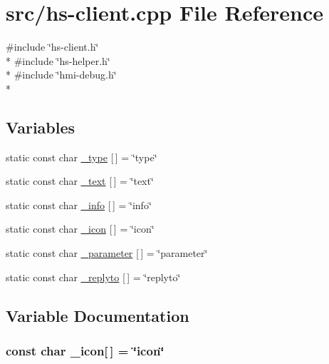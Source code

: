 \hypertarget{hs-client_8cpp}{}\section{src/hs-\/client.cpp File Reference}
\label{hs-client_8cpp}
{\ttfamily \#include \char`\"{}hs-\/client.\+h\char`\"{}}\\*
{\ttfamily \#include \char`\"{}hs-\/helper.\+h\char`\"{}}\\*
{\ttfamily \#include \char`\"{}hmi-\/debug.\+h\char`\"{}}\\*
\subsection*{Variables}
\begin{DoxyCompactItemize}
\item 
static const char \hyperlink{hs-client_8cpp_a1c24b43242df87f75631175c75afdcda}{\+\_\+type} \mbox{[}$\,$\mbox{]} = \char`\"{}type\char`\"{}
\item 
static const char \hyperlink{hs-client_8cpp_ad177811d47939fe9404de88672a980ab}{\+\_\+text} \mbox{[}$\,$\mbox{]} = \char`\"{}text\char`\"{}
\item 
static const char \hyperlink{hs-client_8cpp_ae125cd80cb98582684636e46ecf33cac}{\+\_\+info} \mbox{[}$\,$\mbox{]} = \char`\"{}info\char`\"{}
\item 
static const char \hyperlink{hs-client_8cpp_a5476c8a51997c773220bec9fc02eeaf5}{\+\_\+icon} \mbox{[}$\,$\mbox{]} = \char`\"{}icon\char`\"{}
\item 
static const char \hyperlink{hs-client_8cpp_ae3fc16098a2461f2f1ae0ac8561437c6}{\+\_\+parameter} \mbox{[}$\,$\mbox{]} = \char`\"{}parameter\char`\"{}
\item 
static const char \hyperlink{hs-client_8cpp_ac5b722c0d87d2b0e3dfc527b44a1f5db}{\+\_\+replyto} \mbox{[}$\,$\mbox{]} = \char`\"{}replyto\char`\"{}
\end{DoxyCompactItemize}


\subsection{Variable Documentation}
\subsubsection[{\texorpdfstring{\+\_\+icon}{_icon}}]{\setlength{\rightskip}{0pt plus 5cm}const char \+\_\+icon\mbox{[}$\,$\mbox{]} = \char`\"{}icon\char`\"{}\hspace{0.3cm}{\ttfamily [static]}}\hypertarget{hs-client_8cpp_a5476c8a51997c773220bec9fc02eeaf5}{}\label{hs-client_8cpp_a5476c8a51997c773220bec9fc02eeaf5}


